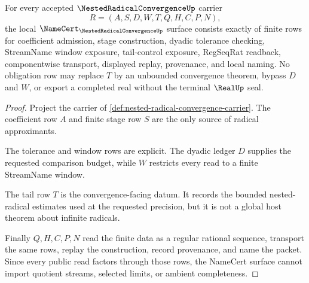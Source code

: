 \begin{theorem}
\label{thm:nested-radical-convergence-namecert-obligations}
For every accepted $\NestedRadicalConvergenceUp$ carrier
$$
R=(A,S,D,W,T,Q,H,C,P,N),
$$
the local $\NameCert_{\NestedRadicalConvergenceUp}$ surface consists exactly of finite rows for coefficient admission, stage construction, dyadic tolerance checking, StreamName window exposure, tail-control exposure, RegSeqRat readback, componentwise transport, displayed replay, provenance, and local naming. No obligation row may replace $T$ by an unbounded convergence theorem, bypass $D$ and $W$, or export a completed real without the terminal $\RealUp$ seal.
\end{theorem}
\begin{proof}
Project the carrier of \autoref{def:nested-radical-convergence-carrier}. The coefficient row $A$ and finite stage row $S$ are the only source of radical approximants.

The tolerance and window rows are explicit. The dyadic ledger $D$ supplies the requested comparison budget, while $W$ restricts every read to a finite StreamName window.

The tail row $T$ is the convergence-facing datum. It records the bounded nested-radical estimates used at the requested precision, but it is not a global host theorem about infinite radicals.

Finally $Q,H,C,P,N$ read the finite data as a regular rational sequence, transport the same rows, replay the construction, record provenance, and name the packet. Since every public read factors through those rows, the NameCert surface cannot import quotient streams, selected limits, or ambient completeness.
\end{proof}

